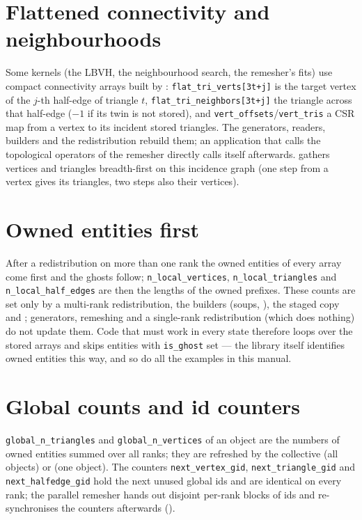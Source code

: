 \section{Flattened connectivity and neighbourhoods}

Some kernels (the LBVH, the neighbourhood search, the remesher's fits) use compact
connectivity arrays built by :
\texttt{flat\_tri\_verts[3t+j]} is the target vertex of the $j$-th half-edge of triangle $t$,
\texttt{flat\_tri\_neighbors[3t+j]} the triangle across that half-edge ($-1$ if its twin is
not stored), and \texttt{vert\_offsets}/\texttt{vert\_tris} a CSR map from a vertex to its
incident stored triangles. The generators, readers, builders and the redistribution rebuild
them; an application that calls the topological operators of the remesher directly calls
 itself afterwards.  gathers vertices and triangles
breadth-first on this incidence graph (one step from a vertex gives its triangles, two steps
also their vertices).

\section{Owned entities first}

After a redistribution on more than one rank the owned entities of every array come first
and the ghosts follow; \texttt{n\_local\_vertices}, \texttt{n\_local\_triangles} and
\texttt{n\_local\_half\_edges} are then the lengths of the owned prefixes. These counts are set
only by a multi-rank redistribution, the builders (soups, ), the
staged copy  and ;
generators, remeshing and a single-rank redistribution (which does nothing) do not update
them. Code that must work in every state therefore loops over the stored arrays and skips
entities with \texttt{is\_ghost} set --- the library itself identifies owned entities this way,
and so do all the examples in this manual.

\section{Global counts and id counters}

\texttt{global\_n\_triangles} and \texttt{global\_n\_vertices} of an object are the numbers of owned
entities summed over all ranks; they are refreshed by the collective
 (all objects) or  (one
object). The counters \texttt{next\_vertex\_gid}, \texttt{next\_triangle\_gid} and
\texttt{next\_halfedge\_gid} hold the next unused global ids and are identical on every rank;
the parallel remesher hands out disjoint per-rank blocks of ids and re-synchronises the
counters afterwards ().
